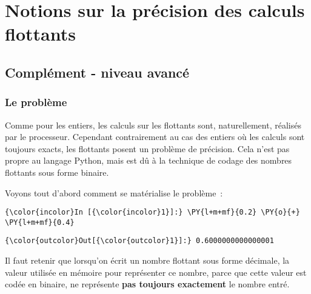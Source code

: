     
    
    
    

    

    \hypertarget{notions-sur-la-pruxe9cision-des-calculs-flottants}{%
\section{Notions sur la précision des calculs
flottants}\label{notions-sur-la-pruxe9cision-des-calculs-flottants}}

    \hypertarget{compluxe9ment---niveau-avancuxe9}{%
\subsection{Complément - niveau
avancé}\label{compluxe9ment---niveau-avancuxe9}}

    \hypertarget{le-probluxe8me}{%
\subsubsection{Le problème}\label{le-probluxe8me}}

    Comme pour les entiers, les calculs sur les flottants sont,
naturellement, réalisés par le processeur. Cependant contrairement au
cas des entiers où les calculs sont toujours exacts, les flottants
posent un problème de précision. Cela n'est pas propre au langage
Python, mais est dû à la technique de codage des nombres flottants sous
forme binaire.

    Voyons tout d'abord comment se matérialise le problème~:

    \begin{Verbatim}[commandchars=\\\{\},frame=single,framerule=0.3mm,rulecolor=\color{cellframecolor}]
{\color{incolor}In [{\color{incolor}1}]:} \PY{l+m+mf}{0.2} \PY{o}{+} \PY{l+m+mf}{0.4}
\end{Verbatim}


\begin{Verbatim}[commandchars=\\\{\},frame=single,framerule=0.3mm,rulecolor=\color{cellframecolor}]
{\color{outcolor}Out[{\color{outcolor}1}]:} 0.6000000000000001
\end{Verbatim}
            
    Il faut retenir que lorsqu'on écrit un nombre flottant sous forme
décimale, la valeur utilisée en mémoire pour représenter ce nombre,
parce que cette valeur est codée en binaire, ne représente \textbf{pas
toujours exactement} le nombre entré.

